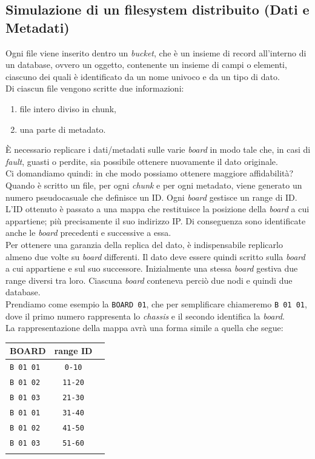 \subsection{Simulazione di un filesystem distribuito (Dati e Metadati)}
Ogni file viene inserito dentro un \textit{bucket}, che \`{e} un insieme di record all'interno di un database, ovvero un oggetto, contenente un insieme di campi o elementi, ciascuno dei quali \`{e} identificato da un nome univoco e da un tipo di dato.\\
Di ciascun file vengono scritte due informazioni:
\begin{enumerate}
\item 
file intero diviso in chunk,
\item
una parte di metadato.\\
\end{enumerate}
\`{E} necessario replicare i dati/metadati sulle varie \textit{board} in modo tale che, in casi di \textit{fault}, guasti o perdite, sia possibile ottenere nuovamente il dato originale.\\
Ci domandiamo quindi: in che modo possiamo ottenere maggiore affidabilit\`{a}?
Quando \`{e} scritto un file, per ogni \textit{chunk} e per ogni metadato, viene generato un numero pseudocasuale che definisce un ID. 
Ogni \textit{board} gestisce un range di ID.
L'ID ottenuto \`{e} passato a una mappa che restituisce la posizione della \textit{board} a cui appartiene; pi\`{u} precisamente il suo indirizzo IP. Di conseguenza sono identificate anche le \textit{board} precedenti e successive a essa.\\
Per ottenere una garanzia della replica del dato, \`{e} indispensabile replicarlo almeno due volte su \textit{board} differenti. Il dato deve essere quindi scritto sulla \textit{board} a cui appartiene e sul suo successore.
Inizialmente una stessa \textit{board} gestiva due range diversi tra loro. Ciascuna \textit{board} conteneva perci\`{o} due nodi e quindi due database.\\
Prendiamo come esempio la \verb"BOARD 01", che per semplificare chiameremo \verb"B 01 01", dove il primo numero rappresenta lo \textit{chassis} e il secondo identifica la \textit{board}.\\
La rappresentazione della mappa avr\`{a} una forma simile a quella che segue:\\
\begin{center}
\begin{tabular}{ | l | c | r}
\hline
\textbf{BOARD} & \textbf{range ID}\\
\hline
\verb"B 01 01" & \verb"0-10"\\
\verb"B 01 02" & \verb"11-20"\\
\verb"B 01 03" & \verb"21-30"\\
\verb"B 01 01" & \verb"31-40"\\
\verb"B 01 02" & \verb"41-50"\\
\verb"B 01 03" & \verb"51-60"\\
\hline
\\
\end{tabular}
\end{center}
\\

